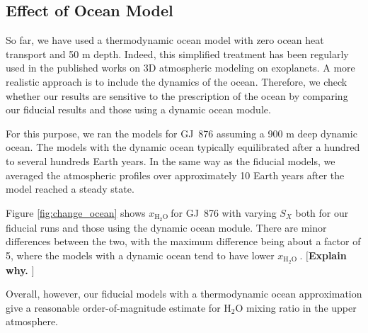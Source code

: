 \documentclass[11pt,numberedappendix,twocolappendix,]{emulateapj}
\def\water{H$_2$O }
\def\xwater{$x_\text{\water}$}
\def\memo#1{\color{red}$[${\bf #1}$]$ \color{black}}
\newcommand{\dsa}[1]{{\color{blue}#1}}
\begin{document}
\subsection{Effect of Ocean Model}
\label{ss:sensitivity_ocean}


So far, we have used a thermodynamic ocean model with zero ocean heat transport and 50 m depth. 
Indeed, this simplified treatment has been regularly used in the published works on 3D atmospheric modeling on exoplanets. 
A more realistic approach is to include the dynamics of the ocean. 
Therefore, we check whether our results are sensitive to the prescription of the ocean by comparing our fiducial results and those using a dynamic ocean module. 

For this purpose, we ran the models for GJ~876 assuming a 900 m deep dynamic ocean. 
The models with the dynamic ocean typically equilibrated after a hundred to several hundreds Earth years. 
In the same way as the fiducial models, we averaged the atmospheric profiles  over approximately 10 Earth years after the model reached a steady state. 

Figure \ref{fig:change_ocean} shows \xwater for GJ~876 with varying $S_X$ both for our fiducial runs and those using the dynamic ocean module.  
There are minor differences between the two, with the maximum difference being about a factor of 5, where the models with a dynamic ocean tend to have lower \xwater. 
\memo{Explain why. }

Overall, however, our fiducial models with a thermodynamic ocean approximation give a reasonable order-of-magnitude estimate for \water mixing ratio in the upper atmosphere. 
\end{document}
